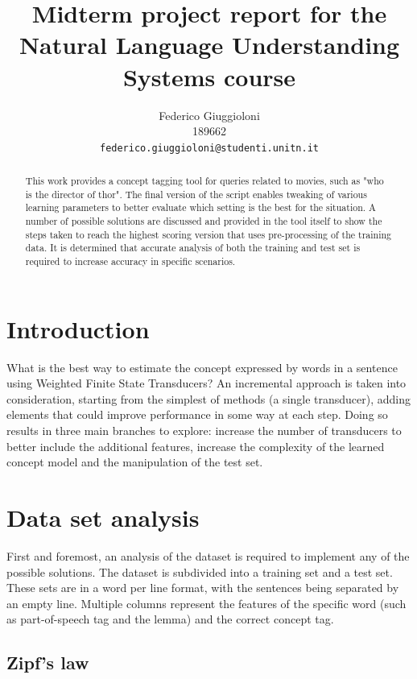 \documentclass[11pt,a4paper]{article}
\title{Midterm project report for the Natural Language Understanding Systems course}
\author{Federico Giuggioloni \\
  189662 \\
  {\tt federico.giuggioloni@studenti.unitn.it}}
\date{}
\begin{document}
\maketitle
\begin{abstract}
  This work provides a concept tagging tool for queries related to movies, such as "who is the director of thor".
  The final version of the script enables tweaking of various learning parameters to better evaluate which setting is the best for the situation.
  A number of possible solutions are discussed and provided in the tool itself to show the steps taken to reach the highest scoring version that uses pre-processing of the training data. It is determined that accurate analysis of both the training and test set is required to increase accuracy in specific scenarios.
\end{abstract}

\section{Introduction}

What is the best way to estimate the concept expressed by words in a sentence using Weighted Finite State Transducers?
An incremental approach is taken into consideration, starting from the simplest of methods (a single transducer), adding elements that could improve performance in some way at each step. Doing so results in three main branches to explore: increase the number of transducers to better include the additional features, increase the complexity of the learned concept model and the manipulation of the test set.

\section{Data set analysis}

First and foremost, an analysis of the dataset is required to implement any of the possible solutions.
The dataset is subdivided into a training set and a test set.
These sets are in a word per line format, with the sentences being separated by an empty line.
Multiple columns represent the features of the specific word (such as part-of-speech tag and the lemma) and the correct concept tag.

\subsection{Zipf's law}
\end{document}
